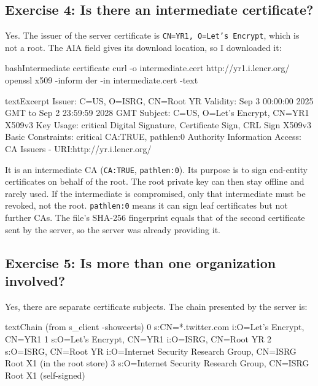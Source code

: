         \subsection{Exercise 4: Is there an intermediate certificate?}

            Yes. The issuer of the server certificate is \texttt{CN=YR1, O=Let's Encrypt}, which is
            not a root. The AIA field gives its download location, so I downloaded it:

            \begin{codeblock}[]{bash}{Intermediate certificate}
                curl -o intermediate.cert http://yr1.i.lencr.org/
                openssl x509 -inform der -in intermediate.cert -text
            \end{codeblock}

            \begin{codeblock}[]{text}{Excerpt}
                Issuer: C=US, O=ISRG, CN=Root YR
                Validity: Sep  3 00:00:00 2025 GMT  to  Sep  2 23:59:59 2028 GMT
                Subject: C=US, O=Let's Encrypt, CN=YR1
                X509v3 Key Usage: critical  Digital Signature, Certificate Sign, CRL Sign
                X509v3 Basic Constraints: critical  CA:TRUE, pathlen:0
                Authority Information Access: CA Issuers - URI:http://yr.i.lencr.org/
            \end{codeblock}

            It is an intermediate CA (\texttt{CA:TRUE}, \texttt{pathlen:0}). Its purpose is to sign
            end-entity certificates on behalf of the root. The root private key can then stay
            offline and rarely used. If the intermediate is compromised, only that
            intermediate must be revoked, not the root. \texttt{pathlen:0} means it can sign
            leaf certificates but not further CAs. The file's SHA-256 fingerprint
            equals that of the second certificate sent by the server, so the server was already
            providing it.

        \subsection{Exercise 5: Is more than one organization involved?}

            Yes, there are separate certificate subjects. The chain
            presented by the server is:

            \begin{codeblock}[]{text}{Chain (from s\_client -showcerts)}
                0 s:CN=*.twitter.com            i:O=Let's Encrypt, CN=YR1
                1 s:O=Let's Encrypt, CN=YR1     i:O=ISRG, CN=Root YR
                2 s:O=ISRG, CN=Root YR          i:O=Internet Security Research Group, CN=ISRG Root X1
                (in the root store)
                3 s:O=Internet Security Research Group, CN=ISRG Root X1   (self-signed)
            \end{codeblock}

